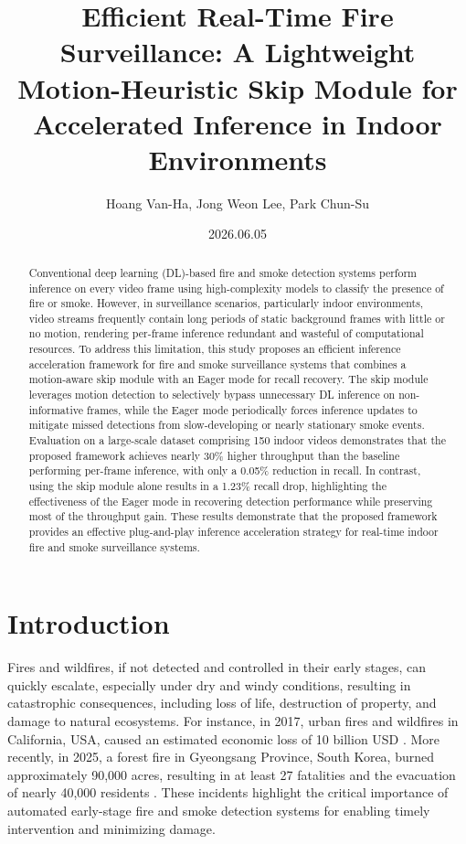 \documentclass[
  10pt,
]{article}
\title{Efficient Real-Time Fire Surveillance: A Lightweight
Motion-Heuristic Skip Module for Accelerated Inference in Indoor
Environments}
\author{Hoang Van-Ha, Jong Weon Lee, Park Chun-Su}
\date{2026.06.05}
\begin{document}
\maketitle
\begin{abstract}
Conventional deep learning (DL)-based fire and smoke detection systems
perform inference on every video frame using high-complexity models to
classify the presence of fire or smoke. However, in surveillance
scenarios, particularly indoor environments, video streams frequently
contain long periods of static background frames with little or no
motion, rendering per-frame inference redundant and wasteful of
computational resources. To address this limitation, this study proposes
an efficient inference acceleration framework for fire and smoke
surveillance systems that combines a motion-aware skip module with an
Eager mode for recall recovery. The skip module leverages motion
detection to selectively bypass unnecessary DL inference on
non-informative frames, while the Eager mode periodically forces
inference updates to mitigate missed detections from slow-developing or
nearly stationary smoke events. Evaluation on a large-scale dataset
comprising 150 indoor videos demonstrates that the proposed framework
achieves nearly 30\% higher throughput than the baseline performing
per-frame inference, with only a 0.05\% reduction in recall. In
contrast, using the skip module alone results in a 1.23\% recall drop,
highlighting the effectiveness of the Eager mode in recovering detection
performance while preserving most of the throughput gain. These results
demonstrate that the proposed framework provides an effective
plug-and-play inference acceleration strategy for real-time indoor fire
and smoke surveillance systems.
\end{abstract}

\section{Introduction}\label{sec:introduction}

Fires and wildfires, if not detected and controlled in their early
stages, can quickly escalate, especially under dry and windy conditions,
resulting in catastrophic consequences, including loss of life,
destruction of property, and damage to natural ecosystems. For instance,
in 2017, urban fires and wildfires in California, USA, caused an
estimated economic loss of 10 billion USD
. More recently, in 2025, a
forest fire in Gyeongsang Province, South Korea, burned approximately
90,000 acres, resulting in at least 27 fatalities and the evacuation of
nearly 40,000 residents .
These incidents highlight the critical importance of automated
early-stage fire and smoke detection systems for enabling timely
intervention and minimizing damage.
\end{document}
